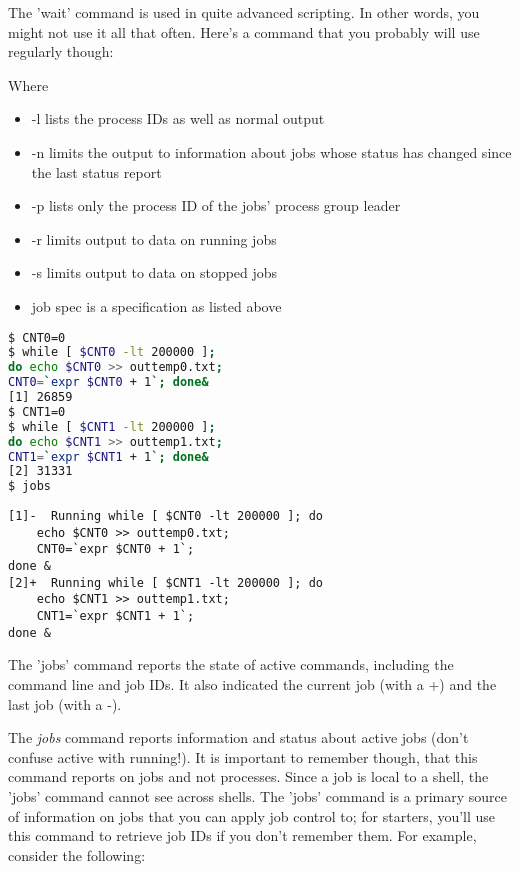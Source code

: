 The 'wait' command is used in quite advanced scripting. In other words, you
might not use it all that often. Here's a command that you probably will use
regularly though:

Where 
\begin{itemize}
\setlength{\leftmargin}{0pt}
\setlength{\itemsep}{0pt}
\setlength{\parsep}{0pt}
\setlength{\parskip}{0pt}
\item -l lists the process IDs as well as normal output
\item -n limits the output to information about jobs whose status has changed since the last status report
\item -p lists only the process ID of the jobs' process group leader
\item -r limits output to data on running jobs
\item -s limits output to data on stopped jobs
\item job spec is a specification as listed above
\end{itemize}

\lstset{basicstyle=\scriptsize, numbers=left, captionpos=b, tabsize=4}
\begin{lstlisting}[caption=another wait,language={bash},
breaklines=true,xleftmargin=15pt,label=lst:anotherwait]
$ CNT0=0
$ while [ $CNT0 -lt 200000 ];
do echo $CNT0 >> outtemp0.txt;
CNT0=`expr $CNT0 + 1`; done&
[1] 26859
$ CNT1=0
$ while [ $CNT1 -lt 200000 ];
do echo $CNT1 >> outtemp1.txt; 
CNT1=`expr $CNT1 + 1`; done&
[2] 31331
$ jobs
\end{lstlisting}
\scriptsize
\begin{verbatim}
[1]-  Running while [ $CNT0 -lt 200000 ]; do
    echo $CNT0 >> outtemp0.txt;
    CNT0=`expr $CNT0 + 1`;
done &
[2]+  Running while [ $CNT1 -lt 200000 ]; do
    echo $CNT1 >> outtemp1.txt;
    CNT1=`expr $CNT1 + 1`;
done &
\end{verbatim}
\normalsize
The 'jobs' command reports the state of active commands, including the command
line and job IDs. It also indicated the current job (with a +) and the last job
(with a -).

The \textit{jobs} command reports information and status about active jobs
(don't confuse active with running!). It is important to remember though, that
this command reports on jobs and not processes. Since a job is local to a
shell, the 'jobs' command cannot see across shells. The 'jobs' command is a
primary source of information on jobs that you can apply job control to; for
starters, you'll use this command to retrieve job IDs if you don't remember
them. For example, consider the following:

